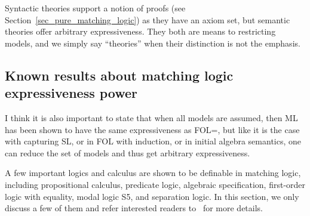 Syntactic theories support a notion of proofs (see 
Section~\ref{sec_pure_matching_logic})
as they have an axiom set,
but semantic theories offer arbitrary expressiveness.
They both are means to restricting models,
and we simply say ``theories'' when their distinction is not the emphasis.





\subsection{Known results about matching logic expressiveness power}

{
I think it is also important to state that when all models are assumed, 
then ML has been shown to have the same expressiveness as FOL=, 
but like it is the case with capturing SL, 
or in FOL with induction, 
or in initial algebra semantics, 
one can reduce the set of models and thus get arbitrary expressiveness.
}



A few important logics and calculus are shown to be definable 
in matching logic, including
propositional calculus, predicate logic,
algebraic specification, first-order logic with equality,
modal logic S5, and separation logic.
In this section, we only discuss a few of them and refer interested readers
to~\cite{bibid} for more details.
